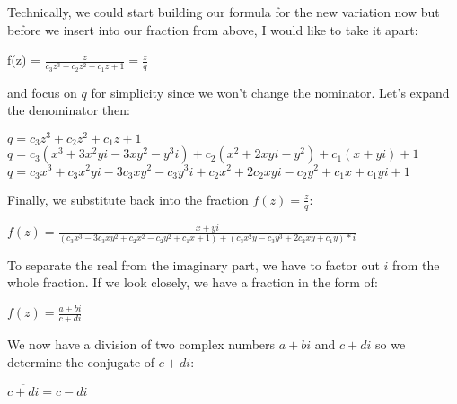 \documentclass[]{article}
\begin{document}
\noindent Technically, we could start building our formula for the new variation now but before we insert into our fraction from above, I would like to take it apart:

\begin{flushleft}
	\hspace{20pt} f(z) = $\frac{z}{c_3z^3 + c_2z^2 + c_1z + 1} = \frac{z}{q}$
\end{flushleft}

\noindent and focus on $q$ for simplicity since we won't change the nominator. Let's expand the denominator then:

\begin{flushleft}
	\hspace{20pt} $q = c_3z^3 + c_2z^2 + c_1z + 1$ \\
	\medskip
	\hspace{20pt} $q = c_3(x^3 + 3x^2yi - 3xy^2 - y^3i) + c_2(x^2 + 2xyi - y^2) + c_1(x + yi) + 1$ \\
	\medskip
	\hspace{20pt} $q = c_3x^3 + c_3x^2yi - 3c_3xy^2 - c_3y^3i + c_2x^2 + 2c_2xyi - c_2y^2 + c_1x + c_1yi + 1 $
\end{flushleft}

\pagebreak

\noindent Finally, we substitute back into the fraction $f(z) = \frac{z}{q}$:

\begin{flushleft}
	\hspace{20pt} $f(z) = \frac{x + yi}{(c_3x^3 - 3c_3xy^2 + c_2x^2 - c_2y^2 + c_1x + 1) + (c_3x^2y - c_3y^3 + 2c_2xy + c_1y) * i}$ \\
\end{flushleft}

\noindent To separate the real from the imaginary part, we have to factor out $i$ from the whole fraction. If we look closely, we have a fraction in the form of:

\begin{flushleft}
	\hspace{20pt} $f(z) = \frac{a + bi}{c + di}$ \\
\end{flushleft}

\noindent We now have a division of two complex numbers $a + bi$ and $c + di$ so we determine the conjugate of $c + di$:

\begin{flushleft}
	\hspace{20pt} $\overline{c+di} = c - di $ \\
\end{flushleft}
\end{document}
